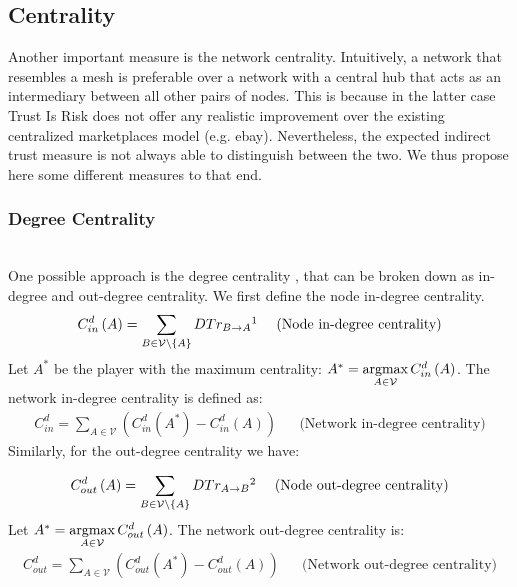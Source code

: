 \subsection{Centrality}
  Another important measure is the network centrality. Intuitively, a network that resembles a mesh is preferable over a
  network with a central hub that acts as an intermediary between all other pairs of nodes. This is because in the latter case
  Trust Is Risk does not offer any realistic improvement over the existing centralized marketplaces model (e.g. ebay).
  Nevertheless, the expected indirect trust measure is not always able to distinguish between the two. We thus propose here
  some different measures to that end.
  
  \subsubsection{Degree Centrality} \ \\

    One possible approach is the degree centrality \cite{freeman}, that can be broken down as in-degree and out-degree
    centrality. We first define the node in-degree centrality.
    \begin{align*}
      C^d_{in}\left(A\right) = \sum\limits_{B \in \mathcal{V} \setminus \{A\}}DTr_{B \rightarrow A}\footnotemark && \mbox{
      (Node in-degree centrality)}
    \end{align*}
    Let $A^*$ be the player with the maximum centrality: $A^* = \operatorname*{argmax}\limits_{A \in \mathcal{V}}C^d_{in}\left(A\right)$. The
    network in-degree centrality is defined as:
    \begin{align*}
      C^d_{in} = \sum\limits_{A \in \mathcal{V}}\left(C^d_{in}\left(A^*\right) - C^d_{in}\left(A\right)\right) && \mbox{
      (Network in-degree centrality)}
    \end{align*}
    Similarly, for the out-degree centrality we have:
    \addtocounter{footnote}{-1}
    \begin{align*}
      C^d_{out}\left(A\right) = \sum\limits_{B \in \mathcal{V} \setminus \{A\}}DTr_{A \rightarrow B}\footnotemark && \mbox{
      (Node out-degree centrality)}
    \end{align*}
    Let $A^* = \operatorname*{argmax}\limits_{A \in \mathcal{V}}C^d_{out}\left(A\right)$. The network out-degree centrality is:
    \begin{align*}
      C^d_{out} = \sum\limits_{A \in \mathcal{V}}\left(C^d_{out}\left(A^*\right) - C^d_{out}\left(A\right)\right) && \mbox{
      (Network out-degree centrality)}
    \end{align*}

